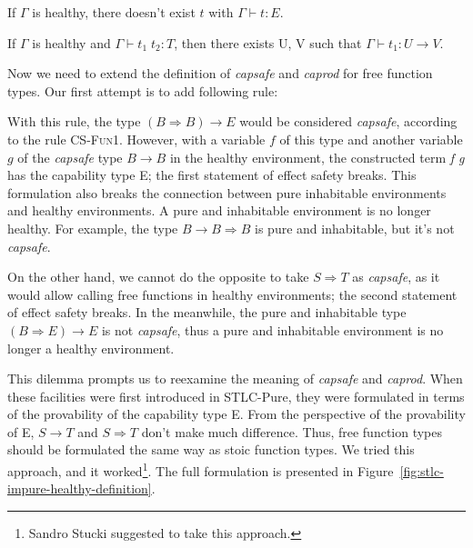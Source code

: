 \begin{definition}
  If $\Gamma$ is healthy, there doesn't exist $t$ with
  $\Gamma \vdash t : E$.
\end{definition}

\begin{definition}
  If $\Gamma$ is healthy and $\Gamma \vdash t_1 \; t_2 : T$, then
  there exists U, V such that $\Gamma \vdash t_1 : U \to V$.
\end{definition}

Now we need to extend the definition of \emph{capsafe} and
\emph{caprod} for free function types. Our first attempt is to add
following rule:


With this rule, the type $(B \Rightarrow B) \to E$ would be considered
\emph{capsafe}, according to the rule \textsc{CS-Fun1}. However, with
a variable $f$ of this type and another variable $g$ of the
\emph{capsafe} type $B \to B$ in the healthy environment, the
constructed term \emph{f g} has the capability type E; the first
statement of effect safety breaks. This formulation also breaks the
connection between pure inhabitable environments and healthy
environments. A pure and inhabitable environment is no longer
healthy. For example, the type $B \to B \Rightarrow B$ is pure and
inhabitable, but it's not \emph{capsafe}.

On the other hand, we cannot do the opposite to take $S \Rightarrow T$
as \emph{capsafe}, as it would allow calling free functions in healthy
environments; the second statement of effect safety breaks. In the
meanwhile, the pure and inhabitable type $(B \Rightarrow E) \to E$ is
not \emph{capsafe}, thus a pure and inhabitable environment is no
longer a healthy environment.

This dilemma prompts us to reexamine the meaning of \emph{capsafe} and
\emph{caprod}. When these facilities were first introduced in
STLC-Pure, they were formulated in terms of the provability of the
capability type E. From the perspective of the provability of E,
$S \to T$ and $S \Rightarrow T$ don't make much difference. Thus, free
function types should be formulated the same way as stoic function
types. We tried this approach, and it worked\footnote{Sandro Stucki
  suggested to take this approach.}. The full formulation is presented
in Figure~\ref{fig:stlc-impure-healthy-definition}.

